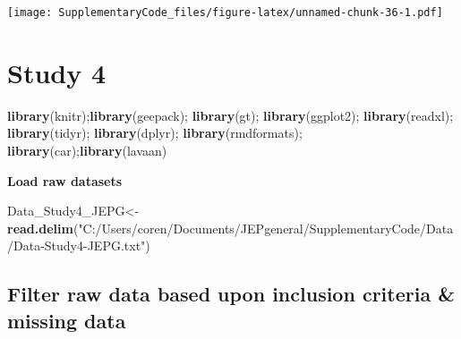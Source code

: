 \documentclass[
]{book}
\newenvironment{Shaded}{\begin{snugshade}}{\end{snugshade}}
\newcommand{\KeywordTok}[1]{\textcolor[rgb]{0.13,0.29,0.53}{\textbf{#1}}}
\newcommand{\NormalTok}[1]{#1}
\newcommand{\StringTok}[1]{\textcolor[rgb]{0.31,0.60,0.02}{#1}}
\begin{document}
\texttt{[image: SupplementaryCode\_files/figure-latex/unnamed-chunk-36-1.pdf]}

\hypertarget{study-4}{%
\chapter{Study 4}\label{study-4}}

\begin{Shaded}
\begin{Highlighting}[]
\KeywordTok{library}\NormalTok{(knitr);}\KeywordTok{library}\NormalTok{(geepack); }\KeywordTok{library}\NormalTok{(gt); }\KeywordTok{library}\NormalTok{(ggplot2); }\KeywordTok{library}\NormalTok{(readxl);  }\KeywordTok{library}\NormalTok{(tidyr); }\KeywordTok{library}\NormalTok{(dplyr); }\KeywordTok{library}\NormalTok{(rmdformats);  }\KeywordTok{library}\NormalTok{(car);}\KeywordTok{library}\NormalTok{(lavaan)}
\end{Highlighting}
\end{Shaded}

\textbf{Load raw datasets}

\begin{Shaded}
\begin{Highlighting}[]
\NormalTok{Data_Study4_JEPG<-}\KeywordTok{read.delim}\NormalTok{(}\StringTok{"C:/Users/coren/Documents/JEPgeneral/SupplementaryCode/Data/Data-Study4-JEPG.txt"}\NormalTok{)}
\end{Highlighting}
\end{Shaded}

\hypertarget{filter-raw-data-based-upon-inclusion-criteria-missing-data-1}{%
\section{Filter raw data based upon inclusion criteria \& missing data}\label{filter-raw-data-based-upon-inclusion-criteria-missing-data-1}}
\end{document}
